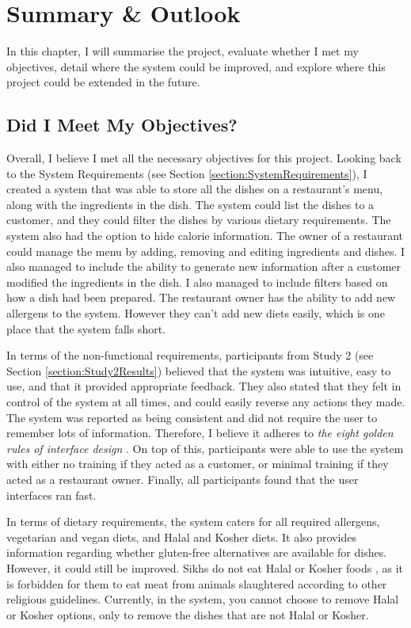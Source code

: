 \chapter{Summary \& Outlook}
\label{section:Evaluation}

In this chapter, I will summarise the project, evaluate whether I met my objectives, detail where the system could be improved, and explore where this project could be extended in the future.

\section{Did I Meet My Objectives?}

Overall, I believe I met all the necessary objectives for this project. Looking back to the System Requirements (see Section \ref{section:SystemRequirements}), I created a system that was able to store all the dishes on a restaurant's menu, along with the ingredients in the dish. The system could list the dishes to a customer, and they could filter the dishes by various dietary requirements. The system also had the option to hide calorie information. The owner of a restaurant could manage the menu by adding, removing and editing ingredients and dishes. I also managed to include the ability to generate new information after a customer modified the ingredients in the dish. I also managed to include filters based on how a dish had been prepared. The restaurant owner has the ability to add new allergens to the system. However they can't add new diets easily, which is one place that the system falls short.

In terms of the non-functional requirements, participants from Study 2 (see Section \ref{section:Study2Results}) believed that the system was intuitive, easy to use, and that it provided appropriate feedback. They also stated that they felt in control of the system at all times, and could easily reverse any actions they made. The system was reported as being consistent and did not require the user to remember lots of information. Therefore, I believe it adheres to \textit{the eight golden rules of interface design} \cite{shneiderman}. On top of this, participants were able to use the system with either no training if they acted as a customer, or minimal training if they acted as a restaurant owner. Finally, all participants found that the user interfaces ran fast.

In terms of dietary requirements, the system caters for all required allergens, vegetarian and vegan diets, and Halal and Kosher diets. It also provides information regarding whether gluten-free alternatives are available for dishes. However, it could still be improved. Sikhs do not eat Halal or Kosher foods \cite{guidance_on_foods_for_religious_faiths_2009}, as it is forbidden for them to eat meat from animals slaughtered according to other religious guidelines. Currently, in the system, you cannot choose to remove Halal or Kosher options, only to remove the dishes that are not Halal or Kosher.

